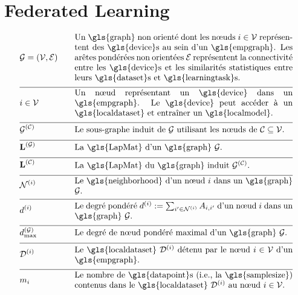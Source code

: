 \newpage
\section*{Federated Learning}

\begin{align}
	&\graph = \pair{\nodes}{\edges} & \quad & \parbox{.75\textwidth}{Un \gls{graph} non orienté dont les nœuds $\nodeidx \in \nodes$ représentent des \gls{device}s au sein d’un \gls{empgraph}. Les arêtes pondérées non orientées $\edges$ représentent la connectivité entre les \gls{device}s et les similarités statistiques entre leurs \gls{dataset}s et \gls{learningtask}s.} \nonumber \\[2mm] \hline \nonumber\\[-5mm]
	&\nodeidx \in \nodes& \quad & \parbox{.75\textwidth}{Un nœud représentant un \gls{device} dans un \gls{empgraph}. Le \gls{device} peut accéder à un \gls{localdataset} et entraîner un \gls{localmodel}.} \nonumber \\[2mm] \hline \nonumber\\[-5mm]
	&\indsubgraph{\graph}{\cluster}& \quad & \parbox{.75\textwidth}{Le sous-graphe induit de $\graph$ utilisant les nœuds de $\cluster \subseteq \nodes$.} \nonumber \\[2mm] \hline \nonumber\\[-5mm]
	&\LapMat{\graph} & \quad & \parbox{.75\textwidth}{La \gls{LapMat} d’un \gls{graph} $\graph$.} \nonumber \\[2mm] \hline \nonumber\\[-5mm]
	&\LapMat{\cluster} & \quad & \parbox{.75\textwidth}{La \gls{LapMat} du \gls{graph} induit $\indsubgraph{\graph}{\cluster}$.} \nonumber \\[2mm] \hline \nonumber\\[-5mm]
	&\neighbourhood{\nodeidx} & \quad & \parbox{.75\textwidth}{Le \gls{neighborhood} d’un nœud $\nodeidx$ dans un \gls{graph} $\graph$.} \nonumber \\[2mm] \hline \nonumber\\[-5mm]
	&\nodedegree{\nodeidx} & \quad & \parbox{.75\textwidth}{Le degré pondéré $\nodedegree{\nodeidx}\defeq \sum_{\nodeidx' \in \neighbourhood{\nodeidx}} \edgeweight_{\nodeidx,\nodeidx'}$ d’un nœud $\nodeidx$ dans un \gls{graph} $\graph$.} \nonumber \\[2mm] \hline \nonumber\\[-5mm]
	&\maxnodedegree^{(\graph)} & \quad & \parbox{.75\textwidth}{Le degré de nœud pondéré maximal d’un \gls{graph} $\graph$.} \nonumber \\[2mm] \hline \nonumber\\[-5mm]
	&\localdataset{\nodeidx} & \quad & \parbox{.75\textwidth}{Le \gls{localdataset} $\localdataset{\nodeidx}$ détenu par le nœud $\nodeidx\in \nodes$ d’un \gls{empgraph}.} \nonumber \\[2mm] \hline \nonumber\\[-5mm]
	&\localsamplesize{\nodeidx} & \quad & \parbox{.75\textwidth}{Le nombre de \gls{datapoint}s (i.e., la \gls{samplesize}) contenus dans le \gls{localdataset} $\localdataset{\nodeidx}$ au nœud $\nodeidx \in \nodes$.} \nonumber 
\end{align}

